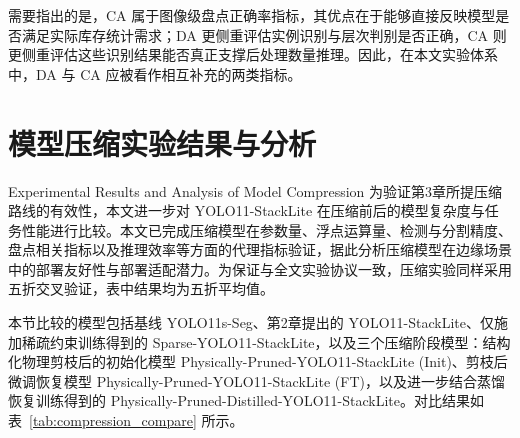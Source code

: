 需要指出的是，CA 属于图像级盘点正确率指标，其优点在于能够直接反映模型是否满足实际库存统计需求；DA 更侧重评估实例识别与层次判别是否正确，CA 则更侧重评估这些识别结果能否真正支撑后处理数量推理。因此，在本文实验体系中，DA 与 CA 应被看作相互补充的两类指标。

\section{模型压缩实验结果与分析}{Experimental Results and Analysis of Model Compression}
为验证第3章所提压缩路线的有效性，本文进一步对 YOLO11-StackLite 在压缩前后的模型复杂度与任务性能进行比较。本文已完成压缩模型在参数量、浮点运算量、检测与分割精度、盘点相关指标以及推理效率等方面的代理指标验证，据此分析压缩模型在边缘场景中的部署友好性与部署适配潜力。为保证与全文实验协议一致，压缩实验同样采用五折交叉验证，表中结果均为五折平均值。

本节比较的模型包括基线 YOLO11s-Seg、第2章提出的 YOLO11-StackLite、仅施加稀疏约束训练得到的 Sparse-YOLO11-StackLite，以及三个压缩阶段模型：结构化物理剪枝后的初始化模型 Physically-Pruned-YOLO11-StackLite (Init)、剪枝后微调恢复模型 Physically-Pruned-YOLO11-StackLite (FT)，以及进一步结合蒸馏恢复训练得到的 Physically-Pruned-Distilled-YOLO11-StackLite。对比结果如表~\ref{tab:compression_compare} 所示。

\begin{table}[htbp]
  \label{tab:compression_compare}
  \centering
  \small
\end{table}

